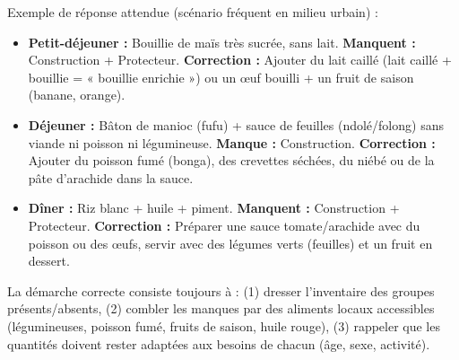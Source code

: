 \documentclass[11pt]{article}
\begin{document}
\begin{corrige}[Exercice 1]
Exemple de réponse attendue (scénario fréquent en milieu urbain) :
\begin{itemize}
\item \textbf{Petit-déjeuner :} Bouillie de maïs très sucrée, sans lait. \rightarrow \textbf{Manquent :} Construction + Protecteur. \textbf{Correction :} Ajouter du lait caillé (lait caillé + bouillie = « bouillie enrichie ») ou un œuf bouilli + un fruit de saison (banane, orange).
\item \textbf{Déjeuner :} Bâton de manioc (fufu) + sauce de feuilles (ndolé/folong) sans viande ni poisson ni légumineuse. \rightarrow \textbf{Manque :} Construction. \textbf{Correction :} Ajouter du poisson fumé (bonga), des crevettes séchées, du niébé ou de la pâte d'arachide dans la sauce.
\item \textbf{Dîner :} Riz blanc + huile + piment. \rightarrow \textbf{Manquent :} Construction + Protecteur. \textbf{Correction :} Préparer une sauce tomate/arachide avec du poisson ou des œufs, servir avec des légumes verts (feuilles) et un fruit en dessert.
\end{itemize}
La démarche correcte consiste toujours à : (1) dresser l'inventaire des groupes présents/absents, (2) combler les manques par des aliments locaux accessibles (légumineuses, poisson fumé, fruits de saison, huile rouge), (3) rappeler que les quantités doivent rester adaptées aux besoins de chacun (âge, sexe, activité).
\end{corrige}
\end{document}
